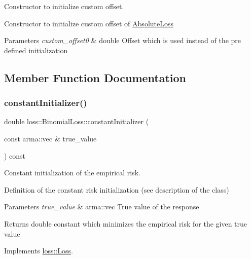 Constructor to initialize custom offset. 

Constructor to initialize custom offset of {\ttfamily \mbox{\hyperlink{classloss_1_1_absolute_loss}{Absolute\+Loss}}}


\begin{DoxyParams}{Parameters}
{\em custom\+\_\+offset0} & {\ttfamily double} Offset which is used instead of the pre defined initialization \\
\hline
\end{DoxyParams}


\subsection{Member Function Documentation}
\mbox{\label{classloss_1_1_binomial_loss_a1292422a2b07c8ebe1b168375940b029}} 
\subsubsection{\texorpdfstring{constant\+Initializer()}{constantInitializer()}}
{\footnotesize\ttfamily double loss\+::\+Binomial\+Loss\+::constant\+Initializer (\begin{DoxyParamCaption}\item[{const arma\+::vec \&}]{true\+\_\+value }\end{DoxyParamCaption}) const\hspace{0.3cm}{\ttfamily [virtual]}}



Constant initialization of the empirical risk. 

Definition of the constant risk initialization (see description of the class)


\begin{DoxyParams}{Parameters}
{\em true\+\_\+value} & {\ttfamily arma\+::vec} True value of the response\\
\hline
\end{DoxyParams}
\begin{DoxyReturn}{Returns}
{\ttfamily double} constant which minimizes the empirical risk for the given true value 
\end{DoxyReturn}


Implements \mbox{\hyperlink{classloss_1_1_loss_a65fe7dcd9370e6a549b8d1cc95fc8798}{loss\+::\+Loss}}.

